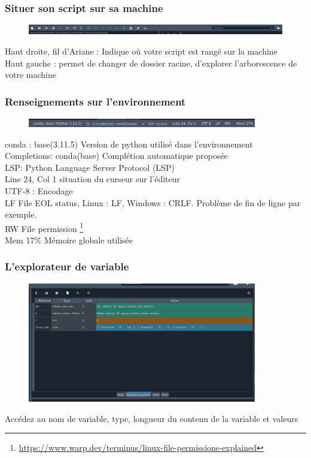 \begin{frame}
  \frametitle{Situer son script sur sa machine}
  \begin{figure}
  \includegraphics[width=15cm]{images/spyder_chemin.png}
  \end{figure}
   Haut droite, fil d'Ariane : Indique où votre script est rangé sur la machine\\
   Haut gauche : permet de changer de dossier racine, d'explorer l'arborescence de votre machine
\end{frame}

\begin{frame}
  \frametitle{Renseignements sur l'environnement}
  \begin{figure}
  \includegraphics[width=10cm]{images/spyder_infos.png}
  \end{figure}
   conda : base(3.11.5)  Version de python utilisé dans l'environnement\\
   Completions: conda(base)  Complétion automatique proposée\\
   LSP: Python  Language Server Protocol (LSP) \\
   Line 24, Col 1  situation du curseur sur l'éditeur\\
  UTF-8 : Encodage\\
   LF  File EOL status, Linux : LF, Windows : CRLF. Problème de fin de ligne par exemple.\\
   RW  File permission \footnote{\url{https://www.warp.dev/terminus/linux-file-permissions-explained}}\\
  Mem 17\%  Mémoire globale utilisée
  
\end{frame}

\begin{frame}  
\frametitle{L'explorateur de variable}
\begin{figure}
  \includegraphics[width=10cm]{images/spyder_explo_variable.png}
  \end{figure}
   Accédez au nom de variable, type, longueur du contenu de la variable et valeurs
\end{frame}

